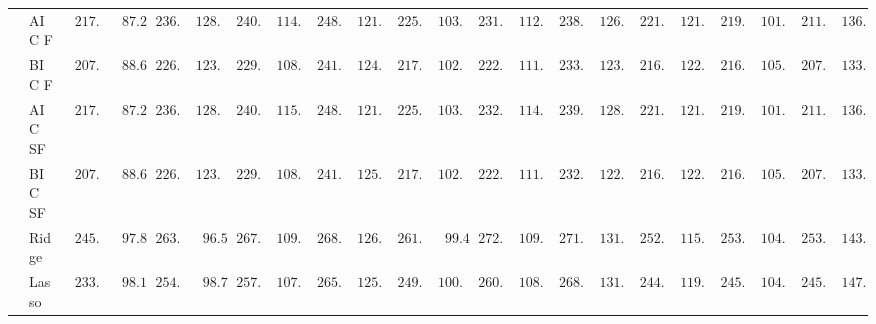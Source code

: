 \begin{tabular}{ll|ll|llllll|llllll|llllll}
 & AIC F  & $\phantom{0}217.01$ & $\phantom{00}87.28$ & $\phantom{0}236.19$ & $\phantom{0}128.24$ & $\phantom{0}240.08$ & $\phantom{0}114.50$ & $\phantom{0}248.34$ & $\phantom{0}121.91$ & $\phantom{0}225.09$ & $\phantom{0}103.13$ & $\phantom{0}231.43$ & $\phantom{0}112.68$ & $\phantom{0}238.13$ & $\phantom{0}126.71$ & $\phantom{0}221.23$ & $\phantom{0}121.50$ & $\phantom{0}219.38$ & $\phantom{0}101.49$ & $\phantom{0}211.56$ & $\phantom{0}136.84$ \\
 & BIC F  & $\phantom{0}207.16$ & $\phantom{00}88.60$ & $\phantom{0}226.96$ & $\phantom{0}123.79$ & $\phantom{0}229.62$ & $\phantom{0}108.81$ & $\phantom{0}241.47$ & $\phantom{0}124.63$ & $\phantom{0}217.90$ & $\phantom{0}102.35$ & $\phantom{0}222.37$ & $\phantom{0}111.19$ & $\phantom{0}233.24$ & $\phantom{0}123.24$ & $\phantom{0}216.38$ & $\phantom{0}122.48$ & $\phantom{0}216.11$ & $\phantom{0}105.02$ & $\phantom{0}207.64$ & $\phantom{0}133.44$ \\
 & AIC SF  & $\phantom{0}217.01$ & $\phantom{00}87.28$ & $\phantom{0}236.19$ & $\phantom{0}128.24$ & $\phantom{0}240.74$ & $\phantom{0}115.43$ & $\phantom{0}248.23$ & $\phantom{0}121.92$ & $\phantom{0}225.16$ & $\phantom{0}103.06$ & $\phantom{0}232.05$ & $\phantom{0}114.12$ & $\phantom{0}239.37$ & $\phantom{0}128.12$ & $\phantom{0}221.35$ & $\phantom{0}121.43$ & $\phantom{0}219.46$ & $\phantom{0}101.61$ & $\phantom{0}211.75$ & $\phantom{0}136.73$ \\
 & BIC SF  & $\phantom{0}207.16$ & $\phantom{00}88.60$ & $\phantom{0}226.96$ & $\phantom{0}123.79$ & $\phantom{0}229.43$ & $\phantom{0}108.87$ & $\phantom{0}241.92$ & $\phantom{0}125.01$ & $\phantom{0}217.90$ & $\phantom{0}102.35$ & $\phantom{0}222.37$ & $\phantom{0}111.19$ & $\phantom{0}232.90$ & $\phantom{0}122.30$ & $\phantom{0}216.38$ & $\phantom{0}122.48$ & $\phantom{0}216.17$ & $\phantom{0}105.06$ & $\phantom{0}207.47$ & $\phantom{0}133.17$ \\
 & Ridge  & $\phantom{0}245.43$ & $\phantom{00}97.85$ & $\phantom{0}263.87$ & $\phantom{00}96.53$ & $\phantom{0}267.83$ & $\phantom{0}109.80$ & $\phantom{0}268.99$ & $\phantom{0}126.97$ & $\phantom{0}261.83$ & $\phantom{00}99.45$ & $\phantom{0}272.21$ & $\phantom{0}109.03$ & $\phantom{0}271.32$ & $\phantom{0}131.05$ & $\phantom{0}252.87$ & $\phantom{0}115.49$ & $\phantom{0}253.48$ & $\phantom{0}104.03$ & $\phantom{0}253.56$ & $\phantom{0}143.72$ \\
 & Lasso  & $\phantom{0}233.09$ & $\phantom{00}98.14$ & $\phantom{0}254.55$ & $\phantom{00}98.78$ & $\phantom{0}257.59$ & $\phantom{0}107.75$ & $\phantom{0}265.26$ & $\phantom{0}125.43$ & $\phantom{0}249.84$ & $\phantom{0}100.77$ & $\phantom{0}260.54$ & $\phantom{0}108.73$ & $\phantom{0}268.59$ & $\phantom{0}131.10$ & $\phantom{0}244.57$ & $\phantom{0}119.74$ & $\phantom{0}245.45$ & $\phantom{0}104.33$ & $\phantom{0}245.98$ & $\phantom{0}147.18$ \\

\end{tabular}
